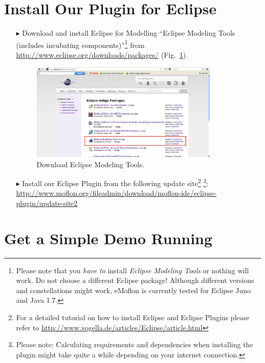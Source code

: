 \section{Install Our Plugin for Eclipse}
\begin{enumerate}
\item[$\blacktriangleright$] Download and install Eclipse for Modelling ``Eclipse Modeling Tools (includes incubating components)''\footnote{Please note that you \emph{have to} install \emph{Eclipse Modeling Tools} or nothing will work.  Do not choose a different Eclipse package!  Although different versions and constellations might work, eMoflon is currently tested for Eclipse Juno and Java 1.7.} from \url{http://www.eclipse.org/downloads/packages/} (Fig.~\ref{fig_downloadModelingPackage}).

\begin{figure}[htbp]
	\centering
  	\includegraphics[width=0.85\textwidth]{pics/installationAndSetup/eclipse_modelingpackage.png}
	\caption{Download Eclipse Modeling Tools.}
	\label{fig_downloadModelingPackage}
\end{figure}

\item[$\blacktriangleright$] Install our Eclipse Plugin from the following update site\footnote{For a detailed tutorial on how to install Eclipse and Eclipse Plugins please refer to \url{http://www.vogella.de/articles/Eclipse/article.html}} 
\footnote{Please note: Calculating requirements and dependencies when installing the plugin might take quite a while depending on your internet connection.}:
\url{http://www.moflon.org/fileadmin/download/moflon-ide/eclipse-plugin/update-site2}
\end{enumerate}

\section{Get a Simple Demo Running}

